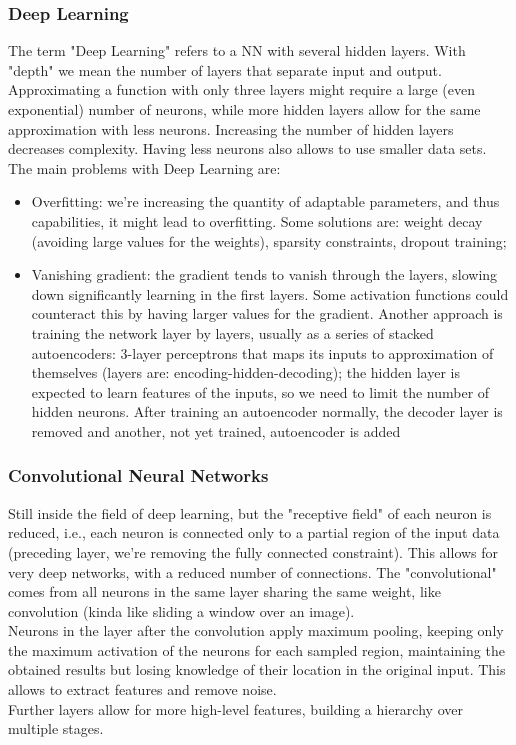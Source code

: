 \subsubsection{Deep Learning}
The term "Deep Learning" refers to a NN with several hidden layers. With "depth" we mean the number of layers that separate input and output. \\
Approximating a function with only three layers might require a large (even exponential) number of neurons, while more hidden layers allow for the same approximation with less neurons. Increasing the number of hidden layers decreases complexity. Having less neurons also allows to use smaller data sets.\\

The main problems with Deep Learning are: 
\begin{itemize}
	\item Overfitting: we're increasing the quantity of adaptable parameters, and thus capabilities, it might lead to overfitting. Some solutions are: weight decay (avoiding large values for the weights), sparsity constraints, dropout training; 
	\item Vanishing gradient: the gradient tends to vanish through the layers, slowing down significantly learning in the first layers. Some activation functions could counteract this by having larger values for the gradient. Another approach is training the network layer by layers, usually as a series of stacked autoencoders: 3-layer perceptrons that maps its inputs to approximation of themselves (layers are: encoding-hidden-decoding); the hidden layer is expected to learn features of the inputs, so we need to limit the number of hidden neurons. After training an autoencoder normally, the decoder layer is removed and another, not yet trained, autoencoder is added
\end{itemize}

\subsubsection{Convolutional Neural Networks}
Still inside the field of deep learning, but the "receptive field" of each neuron is reduced, i.e., each neuron is connected only to a partial region of the input data (preceding layer, we're removing the fully connected constraint). This allows for very deep networks, with a reduced number of connections. The "convolutional" comes from all neurons in the same layer sharing the same weight, like convolution (kinda like sliding a window over an image).\\
Neurons in the layer after the convolution apply maximum pooling, keeping only the maximum activation of the neurons for each sampled region, maintaining the obtained results but losing knowledge of their location in the original input. This allows to extract features and remove noise. \\
Further layers allow for more high-level features, building a hierarchy over multiple stages.\\

